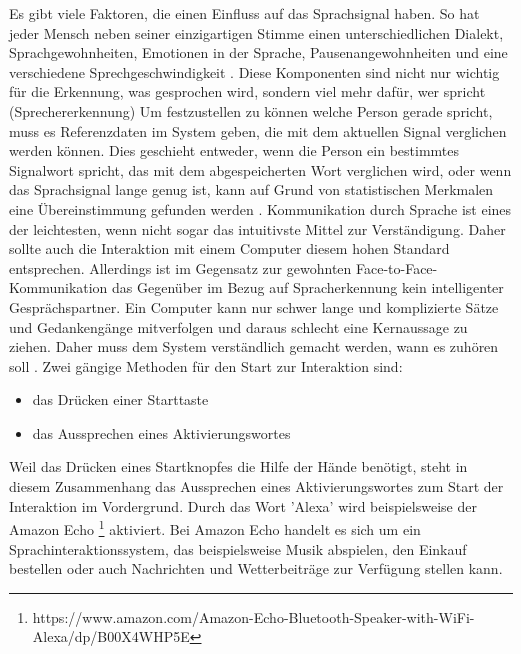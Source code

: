 \newline \newline
Es gibt viele Faktoren, die einen Einfluss auf das Sprachsignal haben. So hat jeder Mensch neben seiner einzigartigen Stimme einen unterschiedlichen Dialekt, Sprachgewohnheiten, Emotionen in der Sprache, Pausenangewohnheiten und eine verschiedene Sprechgeschwindigkeit \cite{KaufmannPfisterSprache}. Diese Komponenten sind nicht nur wichtig für die Erkennung, was gesprochen wird, sondern viel mehr dafür, wer spricht (Sprechererkennung)
\newline \newline
Um festzustellen zu können welche Person gerade spricht, muss es Referenzdaten im System geben, die mit dem aktuellen Signal verglichen werden können. Dies geschieht entweder, wenn die Person ein bestimmtes Signalwort spricht, das mit dem abgespeicherten Wort verglichen wird, oder wenn das Sprachsignal lange genug ist, kann auf Grund von statistischen Merkmalen eine Übereinstimmung gefunden werden \cite{KaufmannPfisterSprache}. 
\newline \newline
Kommunikation durch Sprache ist eines der leichtesten, wenn nicht sogar das intuitivste Mittel zur Verständigung. Daher sollte auch die Interaktion mit einem Computer diesem hohen Standard entsprechen. Allerdings ist im Gegensatz zur gewohnten Face-to-Face-Kommunikation das Gegenüber im Bezug auf Spracherkennung kein intelligenter Gesprächspartner. Ein Computer kann nur schwer lange und komplizierte Sätze und Gedankengänge mitverfolgen und daraus schlecht eine Kernaussage zu ziehen. Daher muss dem System verständlich gemacht werden, wann es zuhören soll \cite{SpeechInteraction}.
Zwei gängige Methoden für den Start zur Interaktion sind:
\begin{itemize}
      \item das Drücken einer Starttaste
      \item das Aussprechen eines Aktivierungswortes
\end{itemize}
\vspace{\baselineskip}
Weil das Drücken eines Startknopfes die Hilfe der Hände benötigt, steht in diesem Zusammenhang das Aussprechen eines Aktivierungswortes zum Start der Interaktion im Vordergrund.
Durch das Wort 'Alexa' wird beispielsweise der Amazon Echo %
\footnote{https://www.amazon.com/Amazon-Echo-Bluetooth-Speaker-with-WiFi-Alexa/dp/B00X4WHP5E}
%
aktiviert. Bei Amazon Echo handelt es sich um ein Sprachinteraktionssystem, das beispielsweise Musik abspielen, den Einkauf bestellen oder auch Nachrichten und Wetterbeiträge zur Verfügung stellen kann.
